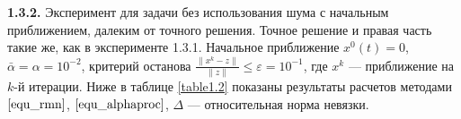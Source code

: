 {\bfseries 1.3.2.} Эксперимент для задачи без использования шума с начальным приближением, далеким от точного решения.
Точное решение и правая часть такие же, как в эксперименте 1.3.1.  Начальное приближение $x^0(t)=0$, $\bar\alpha=\alpha=10^{-2}$, критерий останова $\frac{\|x^k-z\|}{\|z\|}\le\varepsilon=10^{-1}$, где $x^k$ --- приближение на $k$-й итерации. %
Ниже в таблице \ref{table1.2} показаны результаты расчетов методами $\eqref{equ_rmn}$, $\eqref{equ_alphaproc}$, $\Delta$ --- относительная норма невязки. 

